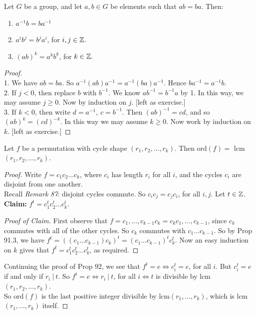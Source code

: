 \documentclass[twoside]{scrartcl}
\begin{document}
\begin{proposition}Let $G$ be a group, and let $a,b\in G$ be elements such that $ab = ba$. Then: \begin{enumerate}
 \item $a^{-1}b = ba^{-1}$
 \item $a^ib^j = b^ja^i$, for $i,j \in \mathbb{Z}$.
 \item $(ab)^k = a^kb^k$, for $k \in \mathbb{Z}.$	
 \end{enumerate}
 \end{proposition}
 
 \begin{proof}~\\ 
 
 1. We have $ab = ba.$ So $a^{-1}(ab)a^{-1} = a^{-1}(ba)a^{-1}$. Hence $ba^{-1} =  a^{-1}b$.\\
 
 2. If $j < 0$, then replace $b$ with $b^{-1}$. We know $ab^{-1} = b^{-1}a$ by 1. In this way, we may assume $j \geq 0$. Now by induction on $j$. [left as exercise.]\\
 
 3. If $k < 0$, then write $d = a^{-1},~c = b^{-1}$. Then $(ab)^{-1} = cd$, and so $(ab)^k = (cd)^{-k}$. In this way we may assume $k \geq 0$. Now work by induction on $k$. [left as exercise.]
 \end{proof}\vspace*{10pt}

 
 
\begin{proposition} Let $f$ be a permutation with cycle shape $(r_1,r_2,\dots,r_k)$. Then ord$(f) =$ lcm$(r_1,r_2,\dots,r_k)$.	
\end{proposition}


 \begin{proof} 

Write   $f = c_1c_2\dots c_k$, where $c_i$ has length $r_i$ for all $i$, and the cycles $c_i$ are disjoint from one another.\\

Recall \textit{Remark 87}: disjoint cycles commute. So $c_ic_j = c_jc_i$, for all $i,j$. Let $t \in \mathbb{Z}$. \textbf{Claim:} $f^t = c_1^tc_2^t\dots c_k^t$. 
\begin{proof}[Proof of Claim] First observe that $f = c_1,\dots,c_{k-1}c_k = c_kc_1,\dots,c_{k-1}$, since $c_k$ commutes with all of the other cycles. So $c_k$ commutes with $c_1\dots c_{k-1}$. So by Prop 91.3, we have $f^t = ((c_1\dots c_{k-1})c_k)^t =(c_1\dots c_{k-1})^t  c_k^t $. Now an easy induction on $k$ gives that $f^t = c_1^tc_2^t\dots c_k^t$, as required.
\end{proof}

Continuing the proof of Prop 92, we see that $f^t = e \iff c_i^t = e$, for all $i$. But $c_i^t = e$ if and only if $r_i ~|~ t$. So $f^t = e \iff r_i ~|~ t$, for all $i \iff t$ is divisible by lcm$(r_1,r_2,\dots,r_k)$.\\

So ord$(f)$ is the last positive integer divisible by lcm$(r_1,\dots,r_k)$, which is lcm$(r_1,\dots,r_k)$ itself.
 \end{proof}\vspace*{10pt}
 
\end{document}
